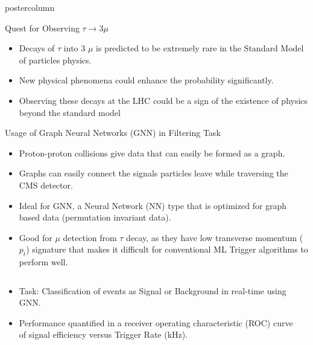 \documentclass[final,hyperref={pdfpagelabels=false}]{beamer}
\begin{document}
\begin{frame}
\begin{columns}
\begin{column}{.49\textwidth}
\begin{beamercolorbox}[center,wd=\textwidth]{postercolumn}
\begin{minipage}[T]{.95\textwidth}
{            \begin{block}{Quest for Observing $\tau \rightarrow 3 \mu$}
                  \begin{itemize}
                  \item Decays of $\tau$ into 3 $\mu$ is predicted to be extremely rare in the Standard Model of particles physics.
                  \item New physical phenomena could enhance the probability significantly.
                  \item Observing these decays at the LHC could be a sign of the existence of physics beyond the standard model
              \end{itemize}
            \end{block}

            \begin{block}{Usage of Graph Neural Networks (GNN) in Filtering Task}
              \begin{itemize}
              \item Proton-proton collisions give data that can easily be formed as a graph.
              \item Graphs can easily connect the signals particles leave while traversing the CMS detector.
              \item Ideal for GNN, a Neural Network (NN) type that is optimized for graph based data (permutation invariant data).
              \item Good for $\mu$ detection from $\tau$ decay, as they have low transverse momentum ($p_t$) signature that makes
               it difficult for conventional ML Trigger algorithms to perform well.
                \end{itemize}
              \begin{columns}              
              \begin{column}{.49\textwidth}
                \begin{itemize}
              \item Task: Classification of events as Signal or Background in real-time using GNN.
              \item Performance quantified in a receiver operating
                characteristic (ROC) curve of signal efficiency versus
                Trigger Rate (kHz).
              \end{itemize}
            \end{column}
            \begin{column}{.49\textwidth}

\end{column}
\end{columns}
\end{block}}
\end{minipage}
\end{beamercolorbox}
\end{column}
\end{columns}
\end{frame}
\end{document}

